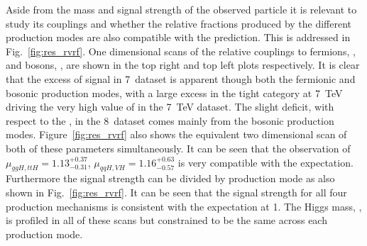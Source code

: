 Aside from the mass and signal strength of the observed particle it is relevant to study its couplings and whether the relative fractions produced by the different production modes are also compatible with the \SM prediction. This is addressed in Fig.~\ref{fig:res_rvrf}. One dimensional \NLL scans of the relative couplings to fermions, \RF, and bosons, \RV, are shown in the top right and top left plots respectively. It is clear that the excess of signal in 7~\TeV dataset is apparent though both the fermionic and bosonic production modes, with a large excess in the tight \VBF category at 7~TeV driving the very high value of \RV in the 7~TeV dataset. The slight deficit, with respect to the \SM, in the 8~\TeV dataset comes mainly from the bosonic production modes. Figure~\ref{fig:res_rvrf} also shows the equivalent two dimensional \NLL scan of both of these parameters simultaneously. It can be seen that the observation of $\mu_{ggH,ttH}=1.13^{+0.37}_{-0.31}$, $\mu_{qqH,VH}=1.16^{+0.63}_{-0.57}$ is very compatible with the \SM expectation. Furthermore the signal strength can be divided by production mode as also shown in Fig.~\ref{fig:res_rvrf}. It can be seen that the signal strength for all four production mechanisms is consistent with the \SM expectation at 1. The Higgs mass, \mH, is profiled in all of these scans but constrained to be the same across each production mode.

